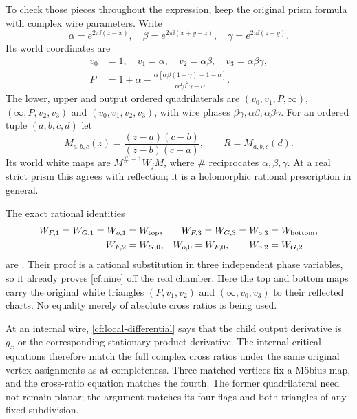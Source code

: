 To check those pieces throughout the expression, keep the
original prism formula with complex wire parameters.
Write
\[
 \alpha=e^{2\pi\ii(z-x)},\quad
 \beta=e^{2\pi\ii(x+y-z)},\quad
 \gamma=e^{2\pi\ii(z-y)}.
\]
Its world coordinates are
\begin{equation}\label{cf:prism}
\begin{split}
 v_0&=1,\quad v_1=\alpha,\quad
 v_2=\alpha\beta,\quad v_3=\alpha\beta\gamma,\\
 P&=1+\alpha-
 \frac{\alpha[\alpha\beta(1+\gamma)-1-\alpha]}
                    {\alpha^2\beta^2\gamma-\alpha}.
\end{split}
\end{equation}
The lower, upper and output ordered quadrilaterals are
$(v_0,v_1,P,\infty)$, $(\infty,P,v_2,v_3)$ and
$(v_0,v_1,v_2,v_3)$, with wire phases
$\beta\gamma,\alpha\beta,\alpha\beta\gamma$.
For an ordered tuple $(a,b,c,d)$ let
\[
 M_{a,b,c}(z)=\frac{(z-a)(c-b)}{(z-b)(c-a)},\qquad
 R=M_{a,b,c}(d).
\]
Its world white maps are $M^{\#\, -1}W_jM$, where $\#$ reciprocates
$\alpha,\beta,\gamma$. At a real strict prism this agrees with
reflection; it is a holomorphic rational prescription in general.

The exact rational identities
\begin{equation}\label{cf:nine}
\begin{aligned}
 W_{F,1}=W_{G,1}=W_{o,1}&=W_{\rm top},&
 W_{F,3}=W_{G,3}=W_{o,3}&=W_{\rm bottom},\\
 W_{F,2}&=W_{G,0},&
 W_{o,0}=W_{F,0},\qquad W_{o,2}&=W_{G,2}
\end{aligned}
\end{equation}
are \cite[equation~(5.5)]{Geometry}. Their proof is a
rational substitution in three independent phase variables, so
it already proves \eqref{cf:nine} off the real chamber.
Here the top and bottom maps carry the original white triangles
$(P,v_1,v_2)$ and $(\infty,v_0,v_3)$ to their reflected charts.
No equality merely of absolute cross ratios is being used.

At an internal wire, \eqref{cf:local-differential} says that
the child output derivative is $g_x$ or the corresponding
stationary product derivative. The internal critical equations
therefore match the full complex cross ratios under the
same original vertex assignments as at completeness.
Three matched vertices fix a Möbius map, and the cross-ratio
equation matches the fourth. The former quadrilateral need not
remain planar; the argument matches its four flags and both
triangles of any fixed subdivision.

